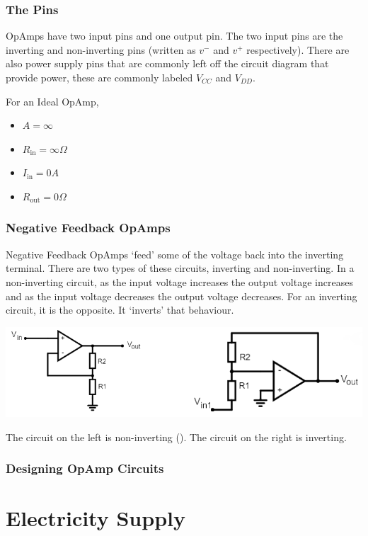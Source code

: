 \documentclass[12pt]{article}
\begin{document}
\subsubsection{The Pins}
OpAmps have two input pins and one output pin.
The two input pins are the inverting and non-inverting pins (written as $v^{-}$ and $v^{+}$ respectively).
There are also power supply pins that are commonly left off the circuit diagram that provide power, these are commonly labeled $V_{CC}$ and $V_{DD}$.

\begin{marginfigure}
  \vspace{ 2cm }
  For an Ideal OpAmp,
  \begin{itemize}
    \item $A = \infty$
    \item $R_{\text{in}} = \infty\Omega$
    \item $I_{\text{in}} = 0A$
    \item $R_{\text{out}} = 0\Omega$
  \end{itemize}
\end{marginfigure}

\subsubsection{Negative Feedback OpAmps}
Negative Feedback OpAmps `feed' some of the voltage back into the inverting terminal.
There are two types of these circuits, inverting and non-inverting.
In a non-inverting circuit, as the input voltage increases the output voltage increases and as the input voltage decreases the output voltage decreases.
For an inverting circuit, it is the opposite.
It `inverts' that behaviour.

\begin{center}
  \includegraphics[scale=0.4]{inverting}
\end{center}

The circuit on the left is non-inverting ().
The circuit on the right is inverting. 
\subsubsection{Designing OpAmp Circuits}

\section{Electricity Supply}
\end{document}
